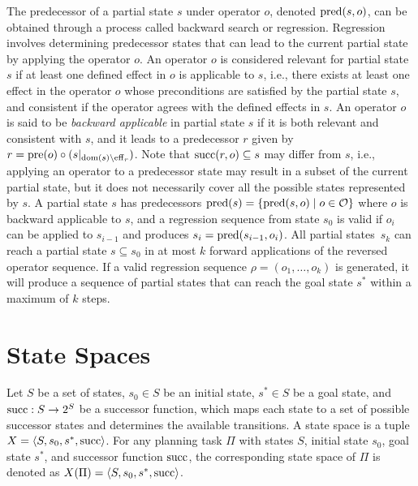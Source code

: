 \documentclass[ppgc,diss,english]{iiufrgs}
\newcommand{\ppi}[2][inline]{\todo[color=purple!50,linecolor={purple!100},#1,fancyline,author=Pedro]{#2}}
\begin{document}
The predecessor of a partial state $s$ under operator $o$, denoted $\operatorname{pred}(s,o)$, can be obtained through a process called backward search or regression. Regression involves determining predecessor states that can lead to the current partial state by applying the operator $o$. An operator $o$ is considered relevant for partial state $s$ if at least one defined effect in $o$ is applicable to $s$, i.e., there exists at least one effect in the operator $o$ whose preconditions are satisfied by the partial state $s$, and consistent if the operator agrees with the defined effects in $s$. An operator $o$ is said to be \emph{backward applicable} in partial state $s$ if it is both relevant and consistent with $s$, and it leads to a predecessor $r$ given by $r=\operatorname{pre}(o)\circ (s|_{\operatorname{dom}(s)\setminus\operatorname{eff}_r})$\ppi{$eff_r$ or $eff_o$?}. Note that $\operatorname{succ}(r,o)\subseteq s$ may differ from $s$, i.e., applying an operator to a predecessor state may result in a subset of the current partial state, but it does not necessarily cover all the possible states represented by $s$.
A partial state $s$ has predecessors $\operatorname{pred}(s)=\{{\operatorname{pred}(s,o)\mid o\in \mathcal{O}}\}$ where $o$ is backward applicable to $s$, and a regression sequence from state $s_0$ is valid if $o_i$ can be applied to $s_{i-1}$ and produces $s_i=\operatorname{pred}(s_{i-1},o_i)$. All partial states~$s_k$ can reach a partial state $s\subseteq s_0$ in at most $k$ forward applications of the reversed operator sequence.
If a valid regression sequence $\rho = (o_1, \ldots, o_k)$ is generated, it will produce a sequence of partial states that can reach the goal state $s^*$ within a maximum of $k$ steps.



\section{State Spaces}
\label{background-state-spaces}

Let $S$ be a set of states, $s_0 \in S$ be an initial state, $s^{*} \in S$ be a goal state, and $\operatorname{succ} : S \to 2^S$ be a successor function, which maps each state to a set of possible successor states and determines the available transitions. A state space is a tuple $X = \langle S, s_0, s^{*}, \operatorname{succ} \rangle$.
For any planning task $\Pi$ with states $S$, initial state $s_0$, goal state $s^{*}$, and successor function $\operatorname{succ}$, the corresponding state space of $\Pi$ is denoted as $X(\Pi) = \langle S, s_0, s^{*}, \operatorname{succ} \rangle$.
\end{document}
